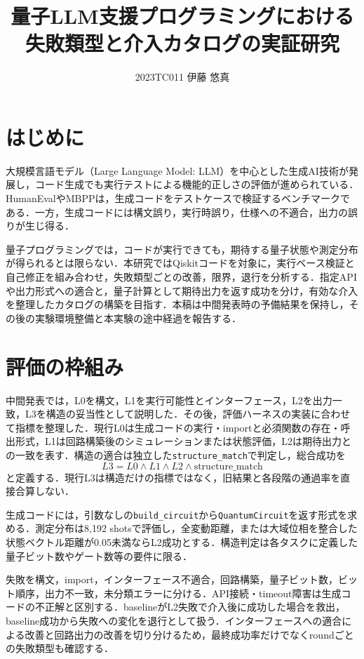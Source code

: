 \documentclass[a4paper,8pt,twocolumn]{extarticle}
\title{量子LLM支援プログラミングにおける\\失敗類型と介入カタログの実証研究}
\author{2023TC011 伊藤 悠真}
\affiliation{指導教員：横山 哲郎}
\begin{document}
\maketitle
\thispagestyle{empty}

\section{はじめに}
大規模言語モデル（Large Language Model: LLM）を中心とした生成AI技術が発展し\cite{brown}，コード生成でも実行テストによる機能的正しさの評価が進められている．HumanEval\cite{chen}やMBPP\cite{austin}は，生成コードをテストケースで検証するベンチマークである．一方，生成コードには構文誤り，実行時誤り，仕様への不適合，出力の誤りが生じ得る．

量子プログラミングでは，コードが実行できても，期待する量子状態や測定分布が得られるとは限らない．本研究ではQiskitコードを対象に，実行ベース検証と自己修正を組み合わせ，失敗類型ごとの改善，限界，退行を分析する．指定APIや出力形式への適合と，量子計算として期待出力を返す成功を分け，有効な介入を整理したカタログの構築を目指す．本稿は中間発表時の予備結果を保持し，その後の実験環境整備と本実験の途中経過を報告する．

\section{評価の枠組み}
中間発表では，L0を構文，L1を実行可能性とインターフェース，L2を出力一致，L3を構造の妥当性として説明した．その後，評価ハーネスの実装に合わせて指標を整理した．現行L0は生成コードの実行・importと必須関数の存在・呼出形式，L1は回路構築後のシミュレーションまたは状態評価，L2は期待出力との一致を表す．構造の適合は独立した\texttt{structure\_match}で判定し，総合成功を
\begin{equation}
 L3=L0\land L1\land L2\land\mathrm{structure\_match}
\end{equation}
と定義する．現行L3は構造だけの指標ではなく，旧結果と各段階の通過率を直接合算しない．

生成コードには，引数なしの\texttt{build\_circuit}から\texttt{QuantumCircuit}を返す形式を求める．測定分布は8,192 shotsで評価し，全変動距離，または大域位相を整合した状態ベクトル距離が0.05未満ならL2成功とする．構造判定は各タスクに定義した量子ビット数やゲート数等の要件に限る．

失敗を構文，import，インターフェース不適合，回路構築，量子ビット数，ビット順序，出力不一致，未分類エラーに分ける．API接続・timeout障害は生成コードの不正解と区別する．baselineがL2失敗で介入後に成功した場合を救出，baseline成功から失敗への変化を退行として扱う．インターフェースへの適合による改善と回路出力の改善を切り分けるため，最終成功率だけでなくroundごとの失敗類型も確認する．
\end{document}
